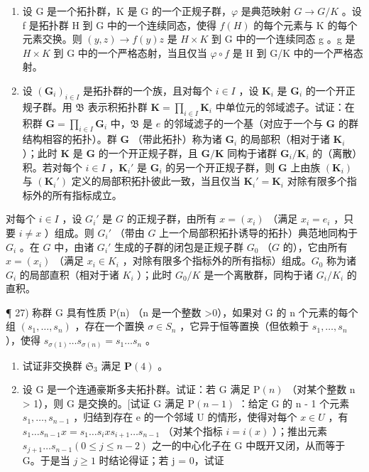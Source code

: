 \begin{enumerate}
\def\labelenumi{\arabic{enumi})}
\setcounter{enumi}{24}
\item
  设 G 是一个拓扑群，K 是 G 的一个正规子群，\(\varphi\) 是典范映射 \(G \rightarrow G/K\) 。设 f 是拓扑群 H 到 G 中的一个连续同态，使得 \(f(H)\) 的每个元素与 K 的每个元素交换。则 \((y, z) \rightarrow f(y)z\) 是 \(H \times K\) 到 G 中的一个连续同态 g 。g 是 \(H \times K\) 到 G 中的一个严格态射，当且仅当 \(\varphi \circ f\) 是 H 到 G/K 中的一个严格态射。
\item
  设 \((\mathbf{G}_i)_{i\in I}\) 是拓扑群的一个族，且对每个 \(i\in I\) ，设 \(\mathbf{K}_i\) 是 \(\mathbf{G}_i\) 的一个开正规子群。用 \(\mathfrak{B}\) 表示积拓扑群 \(\mathbf{K} = \prod_{i\in I}\mathbf{K}_i\) 中单位元的邻域滤子。试证：在积群 \(\mathbf{G} = \prod_{i\in I}\mathbf{G}_i\) 中，\(\mathfrak{B}\) 是 \(e\) 的邻域滤子的一个基（对应于一个与 \(\mathbf{G}\) 的群结构相容的拓扑）。群 \(\mathbf{G}\) （带此拓扑）称为诸 \(\mathbf{G}_i\) 的局部积（相对于诸 \(\mathbf{K}_i\) ）；此时 \(\mathbf{K}\) 是 \(\mathbf{G}\) 的一个开正规子群，且 \(\mathbf{G} / \mathbf{K}\) 同构于诸群 \(\mathbf{G}_i / \mathbf{K}_i\) 的（离散）积。若对每个 \(i\in I\) ，\(\mathbf{K}_i'\) 是 \(\mathbf{G}_i\) 的另一个开正规子群，则 \(\mathbf{G}\) 上由族 \((\mathbf{K}_i)\) 与 \((\mathbf{K}_i')\) 定义的局部积拓扑彼此一致，当且仅当 \(\mathbf{K}_i' = \mathbf{K}_i\) 对除有限多个指标外的所有指标成立。
\end{enumerate}

对每个 \(i \in I\) ，设 \(G_i'\) 是 \(G\) 的正规子群，由所有 \(x = (x_i)\) （满足 \(x_i = e_i\) ，只要 \(i \neq x\) ）组成。则 \(G_i'\) （带由 \(G\) 上一个局部积拓扑诱导的拓扑）典范地同构于 \(G_i\) 。在 \(G\) 中，由诸 \(G_i'\) 生成的子群的闭包是正规子群 \(G_0\) （\(G\) 的），它由所有 \(x = (x_i)\) （满足 \(x_i \in K_i\) ，对除有限多个指标外的所有指标）组成。\(G_0\) 称为诸 \(G_i\) 的局部直积（相对于诸 \(K_i\) ）；此时 \(G_0 / K\) 是一个离散群，同构于诸 \(G_i / K_i\) 的直积。

¶ 27) 称群 G 具有性质 P(n) （n 是一个整数 \textgreater0），如果对 G 的 n 个元素的每个组 \((s_{1}, \ldots, s_{n})\) ，存在一个置换 \(\sigma \in S_{n}\) ，它异于恒等置换（但依赖于 \(s_{1}, \ldots, s_{n}\) ），使得 \(s_{\sigma(1)} \ldots s_{\sigma(n)} = s_{1} \ldots s_{n}\) 。

\begin{enumerate}
\def\labelenumi{\alph{enumi})}
\item
  试证非交换群 \(\mathfrak{S}_3\) 满足 \(\mathbf{P}(4)\) 。
\item
  设 G 是一个连通豪斯多夫拓扑群。试证：若 G 满足 \(\mathrm{P}(n)\) （对某个整数 n \textgreater{} 1），则 G 是交换的。{[}试证 G 满足 \(\mathrm{P}(n - 1)\) ：给定 G 的 n - 1 个元素 \(s_{1}, \ldots, s_{n-1}\) ，归结到存在 e 的一个邻域 U 的情形，使得对每个 \(x \in U\) ，有 \(s_{1} \ldots s_{n-1}x = s_{1} \ldots s_{i}xs_{i+1} \ldots s_{n-1}\) （对某个指标 \(i = i(x)\) ）；推出元素 \(s_{j+1} \ldots s_{n-1} (0 \leqslant j \leqslant n - 2)\) 之一的中心化子在 G 中既开又闭，从而等于 G。于是当 \(j \geqslant 1\) 时结论得证；若 j = 0，试证
\end{enumerate}


